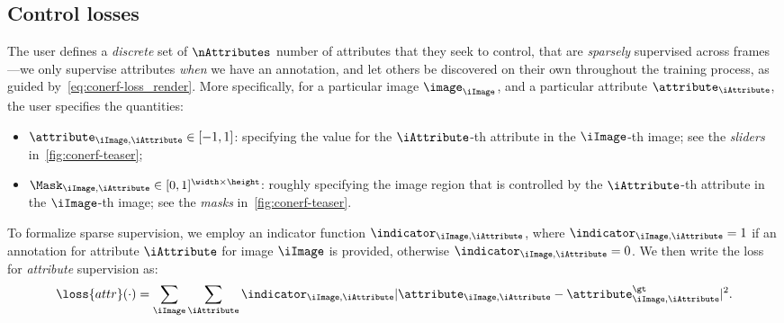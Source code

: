   \subsection{Control losses}
    \label{sec:conerf-control}
    The user defines a \textit{discrete} set of $\nAttributes$ number of
    attributes that they seek to control, that are \textit{sparsely}
    supervised across frames---we only supervise attributes \textit{when} we
    have an annotation, and let others be discovered on their own throughout
    the training process, as guided by~\cref{eq:conerf-loss_render}.
    More specifically, for a particular image $\image_\iImage$, and a particular attribute $\attribute_\iAttribute$, the user specifies the quantities:
    \begin{itemize}
      \item $\attribute_{\iImage, \iAttribute} \in [-1,1]$: specifying the value for the $\iAttribute$-th attribute in the $\iImage$-th image; see the \textit{sliders} in~\cref{fig:conerf-teaser};
      \item $\Mask_{\iImage, \iAttribute} \in [0,1]^{\width \times \height}$: roughly specifying the image region that is controlled by the $\iAttribute$-th attribute in the $\iImage$-th image; see the \textit{masks} in~\cref{fig:conerf-teaser}.
    \end{itemize}
    To formalize sparse supervision, we employ an indicator function
    $\indicator_{\iImage, \iAttribute}$, where $\indicator_{\iImage,
    \iAttribute}=1$ if an annotation for attribute $\iAttribute$ for image
    $\iImage$ is provided, otherwise $\indicator_{\iImage, \iAttribute}=0$.
    We then write the loss for \textit{attribute} supervision as:
    \begin{equation}
      \loss{attr}(\cdot) =
      \sum_\iImage \sum_\iAttribute
      \indicator_{\iImage, \iAttribute}
      |\attribute_{\iImage,\iAttribute} - \attribute^\gt_{\iImage,\iAttribute}|^2
      .
    \end{equation}

